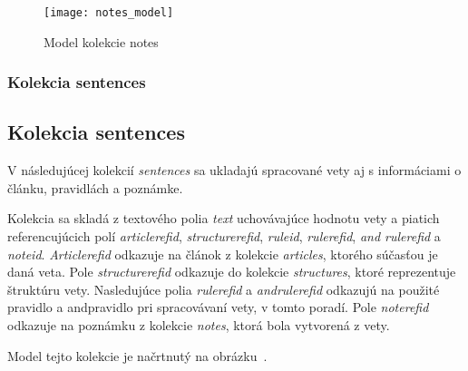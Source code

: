 \begin{figure}[H]
	\begin{center}\texttt{[image: notes\_model]}\end{center}
	\caption[Model kolekcie notes]{Model kolekcie notes}\label{fig:notes_collection_model}
\end{figure}

%
%
{
	\subsubsection{Kolekcia sentences}
}
{
	\subsection{Kolekcia sentences}
}
\label{subsubsection:collection_sentences}
V následujúcej kolekcií \textit{sentences} sa ukladajú spracované vety aj s informáciami o článku, pravidlách a poznámke.

Kolekcia sa skladá z textového polia \textit{text} uchovávajúce hodnotu vety a piatich referencujúcich polí \textit{article\textunderscore ref\textunderscore id}, \textit{structure\textunderscore ref\textunderscore id}, \textit{rule\textunderscore id}, \textit{rule\textunderscore ref\textunderscore id}, \textit{and \textunderscore rule\textunderscore ref\textunderscore id} a \textit{note\textunderscore id}. \textit{Article\textunderscore ref\textunderscore id} odkazuje na článok z kolekcie \textit{articles}, ktorého súčasťou je daná veta. Pole \textit{structure\textunderscore ref\textunderscore id} odkazuje do kolekcie \textit{structures}, ktoré reprezentuje štruktúru vety. Nasledujúce polia \textit{rule\textunderscore ref\textunderscore id} a \textit{and\textunderscore rule\textunderscore ref\textunderscore id} odkazujú na použité pravidlo a and\hyph pravidlo pri spracovávaní vety, v tomto poradí. Pole \textit{note\textunderscore ref\textunderscore id} odkazuje na poznámku z kolekcie \textit{notes}, ktorá bola vytvorená z vety.

Model tejto kolekcie je načrtnutý na obrázku~.

